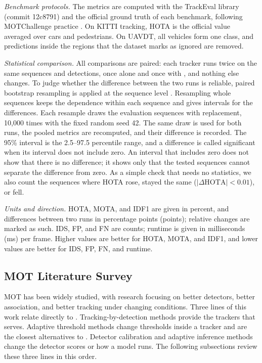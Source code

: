 \emph{Benchmark protocols.} The metrics are computed with the TrackEval library (commit 12c8791)
and the official ground truth of each benchmark, following MOTChallenge practice
\cite{dendorfer2021motchallenge}. On KITTI tracking, HOTA is the official value averaged over cars
and pedestrians. On UAVDT, all vehicles form one class, and predictions inside the regions that the
dataset marks as ignored are removed.

\emph{Statistical comparison.} All comparisons are paired: each tracker runs twice on the same
sequences and detections, once alone and once with \scl{}, and nothing else changes. To judge
whether the difference between the two runs is reliable, paired bootstrap resampling is applied at
the sequence level \cite{efron1993bootstrap}. Resampling whole sequences keeps the dependence within
each sequence and gives intervals for the differences. Each resample draws the evaluation sequences
with replacement, 10,000 times with the fixed random seed 42. The same draw is used for both runs,
the pooled metrics are recomputed, and their difference is recorded. The 95\% interval is the
2.5--97.5 percentile range, and a difference is called significant when its interval does not
include zero. An interval that includes zero does not show that there is no difference; it shows
only that the tested sequences cannot separate the difference from zero. As a simple check that needs no statistics, we also count the sequences where HOTA
rose, stayed the same ($|\Delta\mathrm{HOTA}|<0.01$), or fell.

\emph{Units and direction.} HOTA, MOTA, and IDF1 are given in percent, and differences between two
runs in percentage points (points); relative changes are marked as such. IDS, FP, and FN are counts;
runtime is given in milliseconds (ms) per frame. Higher values are better for HOTA, MOTA, and IDF1,
and lower values are better for IDS, FP, FN, and runtime.

\subsection{MOT Literature Survey}\label{sec:survey}
MOT has been widely studied, with research focusing on better detectors, better association, and
better tracking under changing conditions. Three lines of this work relate directly to \scl{}.
Tracking-by-detection methods provide the trackers that \scl{} serves. Adaptive threshold methods
change thresholds inside a tracker and are the closest alternatives to \scl{}. Detector calibration
and adaptive inference methods change the detector scores or how a model runs. The following
subsections review these three lines in this order.

